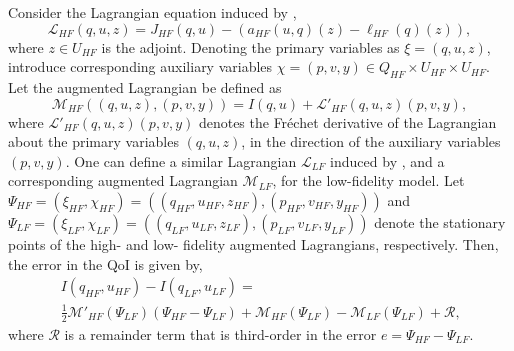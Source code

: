 \begin{proposition}
Consider the Lagrangian equation induced by ,
%
\begin{equation}
\label{eq:InvsOpt_lag}
\mathcal{L}_{HF}(q,u,z)= J_{HF}(q,u)-(a_{HF}(u,q)(z)-\ell_{HF}(q)(z)),
\end{equation}
%
where $z\in U_{HF}$ is the adjoint. Denoting the primary variables as $\xi=(q,u,z)$, introduce corresponding auxiliary variables $\chi=(p,v,y)\in Q_{HF}\times U_{HF}\times U_{HF}$. Let the augmented Lagrangian be defined as
%
\begin{equation}
\label{eq:InvsOpt_auglag}
\mathcal{M}_{HF}((q,u,z),(p,v,y)) = I(q,u) + \mathcal{L}'_{HF}(q,u,z)(p,v,y),
\end{equation}
%
where $\mathcal{L}'_{HF}(q,u,z)(p,v,y)$ denotes the Fr\'{e}chet derivative of the Lagrangian about the primary variables $(q,u,z)$, in the direction of the auxiliary variables $(p,v,y)$. One can define a similar Lagrangian $\mathcal{L}_{LF}$ induced by , and a corresponding augmented Lagrangian $\mathcal{M}_{LF}$, for the low-fidelity model. Let $\Psi_{HF}= (\xi_{HF},\chi_{HF})=((q_{HF},u_{HF},z_{HF}),(p_{HF},v_{HF},y_{HF}))$ and $\Psi_{LF}= (\xi_{LF},\chi_{LF})=((q_{LF},u_{LF},z_{LF}),(p_{LF},v_{LF},y_{LF}))$ denote the stationary points of the high- and low- fidelity augmented Lagrangians, respectively. Then, the error in the QoI is given by,
%
\begin{multline}
\label{eq:semifinErrExp}
I(q_{HF},u_{HF})-I(q_{LF},u_{LF})=\\\frac{1}{2}\mathcal{M}'_{HF}(\Psi_{LF})(\Psi_{HF}-\Psi_{LF})+\mathcal{M}_{HF}(\Psi_{LF})-\mathcal{M}_{LF}(\Psi_{LF})+\mathcal{R}\textrm{,}
\end{multline}
%
where $\mathcal{R}$ is a remainder term that is third-order in the error $e=\Psi_{HF}-\Psi_{LF}$.
\end{proposition}
%
